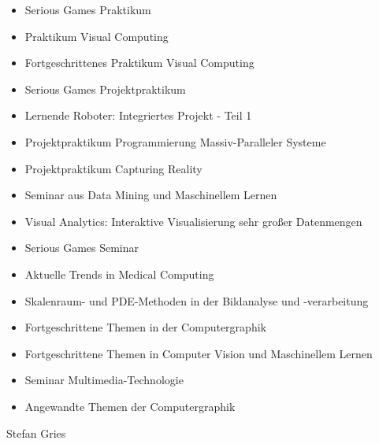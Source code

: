 {\begin{itemize}[noitemsep]
        \item Serious Games Praktikum
        \item Praktikum Visual Computing
        \item Fortgeschrittenes Praktikum Visual Computing
        \item Serious Games Projektpraktikum
        \item Lernende Roboter: Integriertes Projekt - Teil 1
        \item Projektpraktikum Programmierung Massiv-Paralleler Systeme
        \item Projektpraktikum Capturing Reality
        \item Seminar aus Data Mining und Maschinellem Lernen
        \item Visual Analytics: Interaktive Visualisierung sehr großer Datenmengen
        \item Serious Games Seminar
        \item Aktuelle Trends in Medical Computing
        \item Skalenraum- und PDE-Methoden in der Bildanalyse und -verarbeitung
        \item Fortgeschrittene Themen in der Computergraphik
        \item Fortgeschrittene Themen in Computer Vision und Maschinellem Lernen
        \item Seminar Multimedia-Technologie
        \item Angewandte Themen der Computergraphik
    \end{itemize}
}
{Stefan Gries}
